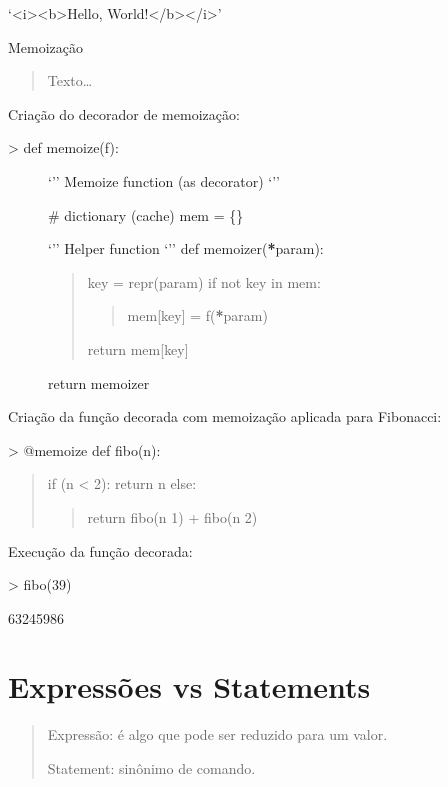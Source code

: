 \documentclass[letterpaper,10pt,brazil]{sphinxmanual}
\begin{document}
‘\textless{}i\textgreater{}\textless{}b\textgreater{}Hello, World!\textless{}/b\textgreater{}\textless{}/i\textgreater{}’

Memoização
\begin{quote}

Texto…
\end{quote}

Criação do decorador de memoização:
\begin{description}
\item[{\textgreater{} def memoize(f):}] \leavevmode
‘’’
Memoize function (as decorator)
‘’’

\# dictionary (cache)
mem = \{\}

‘’’ Helper function ‘’’
def memoizer({\color{red}\bfseries{}*}param):
\begin{quote}

key = repr(param)
if not key in mem:
\begin{quote}

mem{[}key{]} = f({\color{red}\bfseries{}*}param)
\end{quote}

return mem{[}key{]}
\end{quote}

return memoizer

\end{description}

Criação da função decorada com memoização aplicada para Fibonacci:

\textgreater{} @memoize
def fibo(n):
\begin{quote}

if (n \textless{} 2): return n
else:
\begin{quote}

return fibo(n \sphinxhyphen{} 1) + fibo(n \sphinxhyphen{} 2)
\end{quote}
\end{quote}

Execução da função decorada:

\textgreater{} fibo(39)

63245986


\chapter{Expressões vs Statements}
\label{\detokenize{content/exec_eval_execfile_compile:expressoes-vs-statements}}\label{\detokenize{content/exec_eval_execfile_compile::doc}}\begin{quote}

Expressão: é algo que pode ser reduzido para um valor.

Statement: sinônimo de comando.
\end{quote}
\end{document}
